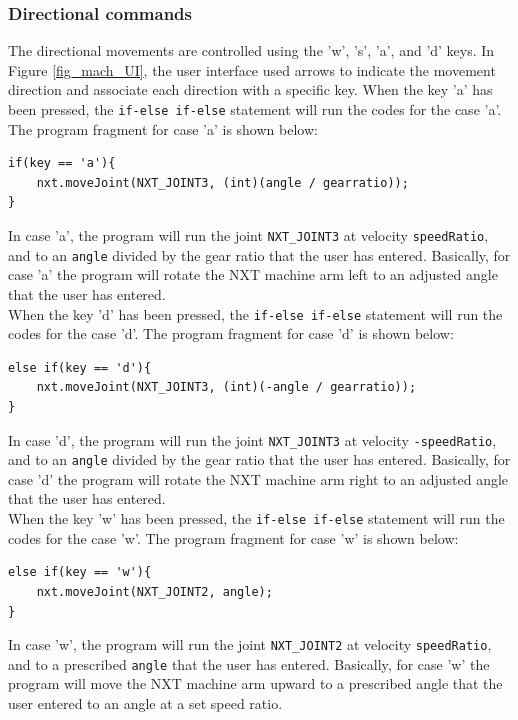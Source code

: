 \documentclass[11pt]{article}
\begin{document}
\subsubsection*{Directional commands}
The directional movements are controlled using the 'w', 's', 'a', and 'd' keys.
In Figure \ref{fig_mach_UI}, the user interface used arrows to indicate the 
movement direction and associate each direction with a specific key.
\newline
When the key 'a' has been pressed, the \verb+if-else if-else+ statement will run the codes for the case 'a'.
The program fragment for case 'a' is shown below:
\begin{verbatim} 
if(key == 'a'){
    nxt.moveJoint(NXT_JOINT3, (int)(angle / gearratio));
}
\end{verbatim}
In case 'a', the program will run the joint \verb+NXT_JOINT3+ at velocity \verb+speedRatio+, 
and to an \verb+angle+ divided by the gear ratio that the user has entered. Basically, for case 
'a' the program will rotate the NXT machine arm left to an adjusted angle that the user has entered.\\

When the key 'd' has been pressed, the \verb+if-else if-else+ statement will run the codes for the case 'd'.
The program fragment for case 'd' is shown below:
\begin{verbatim} 
else if(key == 'd'){
    nxt.moveJoint(NXT_JOINT3, (int)(-angle / gearratio));
}
\end{verbatim}
In case 'd', the program will run the joint \verb+NXT_JOINT3+ at velocity \verb+-speedRatio+,
and to an \verb+angle+ divided by the gear ratio that the user has entered. Basically, for case 'd' 
the program will rotate the NXT machine arm right to an adjusted angle that the user has entered.\\

When the key 'w' has been pressed, the \verb+if-else if-else+ statement will run the codes for the case 'w'.
The program fragment for case 'w' is shown below:
\begin{verbatim} 
else if(key == 'w'){
    nxt.moveJoint(NXT_JOINT2, angle);
}
\end{verbatim}
In case 'w', the program will run the joint \verb+NXT_JOINT2+ at velocity \verb+speedRatio+,
and to a prescribed \verb+angle+ that the user has entered. Basically, for case 'w' the program 
will move the NXT machine arm upward to a prescribed angle that the user entered to an angle at 
a set speed ratio.\\
\end{document}
